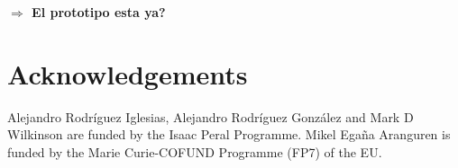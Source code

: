 \documentclass[sw]{iosart2c}
\newcommand{\todo}[1]{\textbf{{\color{blue}$\Longrightarrow$ #1}}}
\begin{document}
\todo{El prototipo esta ya?}

\section*{Acknowledgements}
Alejandro Rodr\'iguez Iglesias, Alejandro Rodr\'iguez Gonz\'alez and Mark D Wilkinson are funded by the Isaac Peral Programme. Mikel Ega\~na Aranguren is funded by the Marie Curie-COFUND Programme (FP7) of the EU.












  
\end{document}
